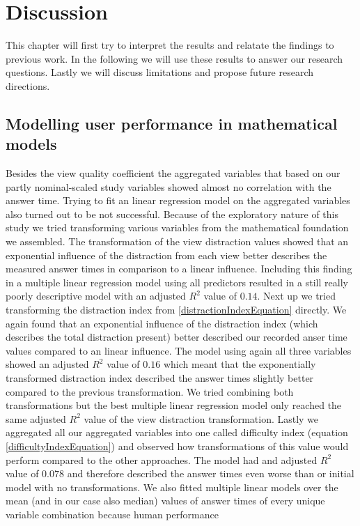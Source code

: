 \chapter{Discussion}
This chapter will first try to interpret the results and relatate the findings to previous work. In the following we will use these results to answer
our research questions. Lastly we will discuss limitations and propose future research directions.
\section{Modelling user performance in mathematical models}
Besides the view quality coefficient the aggregated variables that based on our partly nominal-scaled study variables showed almost no correlation with
the answer time. Trying to fit an linear regression model on the aggregated variables also turned out to be not successful. Because of the exploratory nature
of this study we tried transforming various variables
from the mathematical foundation we assembled. The transformation of the view distraction values showed that an exponential influence of the distraction from each view
better describes the measured answer times in comparison to a linear influence. Including this finding in a multiple linear regression model using all predictors
resulted in a still really poorly descriptive model with an adjusted $R^2$ value of $0.14$. Next up we tried transforming the distraction index from \ref{distractionIndexEquation}
directly. We again found that an exponential influence of the distraction index (which describes the total distraction present) better described our recorded
anser time values compared to an linear influence. The model using again all three variables showed an adjusted $R^2$ value of $0.16$ which meant that the exponentially
transformed distraction index described the answer times slightly better compared to the previous transformation. We tried combining both transformations but the best
multiple linear regression model only reached the same adjusted $R^2$ value of the view distraction transformation. Lastly we aggregated all our aggregated variables
into one called difficulty index (equation \ref{difficultyIndexEquation}) and observed how transformations of this value would perform compared to the other approaches.
The model had and adjusted $R^2$ value of $0.078$ and therefore described the answer times even worse than or initial model with no transformations.
We also fitted multiple linear models over the mean (and in our case also median) values of answer times of every unique variable combination because human performance

